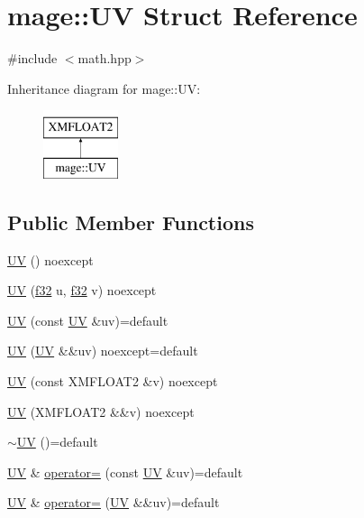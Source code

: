\hypertarget{structmage_1_1_u_v}{}\section{mage\+:\+:UV Struct Reference}
\label{structmage_1_1_u_v}


{\ttfamily \#include $<$math.\+hpp$>$}

Inheritance diagram for mage\+:\+:UV\+:\begin{figure}[H]
\begin{center}
\leavevmode
\includegraphics[height=2.000000cm]{structmage_1_1_u_v}
\end{center}
\end{figure}
\subsection*{Public Member Functions}
\begin{DoxyCompactItemize}
\item 
\hyperlink{structmage_1_1_u_v_a2b7b6f75876aab6a932cb283942eec99}{UV} () noexcept
\item 
\hyperlink{structmage_1_1_u_v_a83a0c7d9ee1cff21f48e5f1e28cb4caf}{UV} (\hyperlink{namespacemage_a6a44ad388483959dc4dff9f2aef91431}{f32} u, \hyperlink{namespacemage_a6a44ad388483959dc4dff9f2aef91431}{f32} v) noexcept
\item 
\hyperlink{structmage_1_1_u_v_a6ae26e6be3db3b2b2fb7e6b8df76fc24}{UV} (const \hyperlink{structmage_1_1_u_v}{UV} \&uv)=default
\item 
\hyperlink{structmage_1_1_u_v_a47ad5c6b2fa30ef9a91bc875d71131b0}{UV} (\hyperlink{structmage_1_1_u_v}{UV} \&\&uv) noexcept=default
\item 
\hyperlink{structmage_1_1_u_v_a20ccaa4ee48cf6a9d072295f62461f7d}{UV} (const X\+M\+F\+L\+O\+A\+T2 \&v) noexcept
\item 
\hyperlink{structmage_1_1_u_v_a7a1800a0330d2ae8705418543fed6465}{UV} (X\+M\+F\+L\+O\+A\+T2 \&\&v) noexcept
\item 
\hyperlink{structmage_1_1_u_v_a9389be8cc9bb64861b69f79b44b6dd1b}{$\sim$\+UV} ()=default
\item 
\hyperlink{structmage_1_1_u_v}{UV} \& \hyperlink{structmage_1_1_u_v_a3ef9497749cc5a99285b110d3f5a59aa}{operator=} (const \hyperlink{structmage_1_1_u_v}{UV} \&uv)=default
\item 
\hyperlink{structmage_1_1_u_v}{UV} \& \hyperlink{structmage_1_1_u_v_ab3a52afacb7c0b6e8f702888f66847f9}{operator=} (\hyperlink{structmage_1_1_u_v}{UV} \&\&uv)=default
\end{DoxyCompactItemize}


